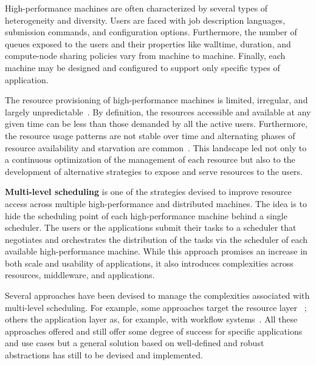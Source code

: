 \documentclass{sig-alternate}
\begin{document}
High-performance machines are often characterized by several types of
heterogeneity and diversity. Users are faced with job description languages,
submission commands, and configuration options. Furthermore, the number of
queues exposed to the users and their properties like walltime, duration, and
compute-node sharing policies vary from machine to machine. Finally, each
machine may be designed and configured to support only specific types of
application.

The resource provisioning of high-performance machines is limited, irregular,
and largely unpredictable~\cite{downey1997,wolski2003,li2004,tsafrir2007}. By
definition, the resources accessible and available at any given time can be less
than those demanded by all the active users. Furthermore, the resource usage
patterns are not stable over time and alternating phases of resource
availability and starvation are common~\cite{Furlani2013,Lu2013}. This landscape
led not only to a continuous optimization of the management of each resource but
also to the development of alternative strategies to expose and serve resources
to the users.


{\bf Multi-level scheduling} is one of the strategies devised to improve
resource access across multiple high-performance and distributed machines. The
idea is to hide the scheduling point of each high-performance machine behind a
single scheduler.  The users or the applications submit their tasks to a
scheduler that negotiates and orchestrates the distribution of the tasks via the
scheduler of each available high-performance machine. While this approach
promises an increase in both scale and usability of applications, it also
introduces complexities across resources, middleware, and applications.


Several approaches have been devised to manage the complexities associated with
multi-level scheduling. For example, some approaches
target the resource layer ~\cite{raicu2007,singh2005,ramakrishnan2006toward,foster2008,juve2008,villegas2012,song2009};
others the application layer as, for example, with workflow
systems~\cite{taylor2014,curcin2008scientific,juve2008,balderrama2012scalable}.
All these approaches offered and still offer some degree of success for specific
applications and use cases but a general solution based on well-defined and
robust abstractions has still to be devised and implemented.
\end{document}
